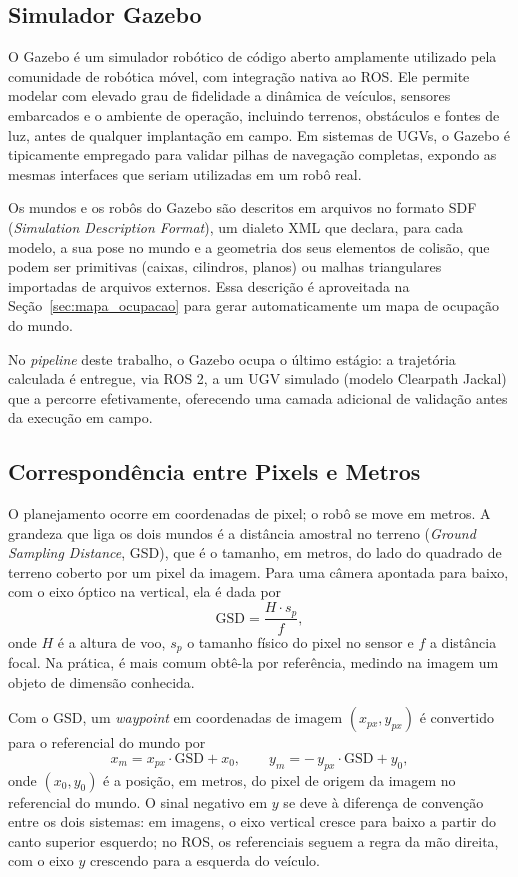 \documentclass[
    12pt,
    openright,
    oneside,
    a4paper,
    english,
    brazil
]{abntex2}
\begin{document}
\subsection{Simulador Gazebo}
\label{sec:gazebo}

O Gazebo \cite{koenig2004} é um simulador robótico de código aberto amplamente utilizado pela comunidade de robótica móvel, com integração nativa ao ROS. Ele permite modelar com elevado grau de fidelidade a dinâmica de veículos, sensores embarcados e o ambiente de operação, incluindo terrenos, obstáculos e fontes de luz, antes de qualquer implantação em campo. Em sistemas de UGVs, o Gazebo é tipicamente empregado para validar pilhas de navegação completas, expondo as mesmas interfaces que seriam utilizadas em um robô real.

Os mundos e os robôs do Gazebo são descritos em arquivos no formato SDF (\textit{Simulation Description Format}), um dialeto XML que declara, para cada modelo, a sua pose no mundo e a geometria dos seus elementos de colisão, que podem ser primitivas (caixas, cilindros, planos) ou malhas triangulares importadas de arquivos externos. Essa descrição é aproveitada na Seção~\ref{sec:mapa_ocupacao} para gerar automaticamente um mapa de ocupação do mundo.

No \textit{pipeline} deste trabalho, o Gazebo ocupa o último estágio: a trajetória calculada é entregue, via ROS 2, a um UGV simulado (modelo Clearpath Jackal) que a percorre efetivamente, oferecendo uma camada adicional de validação antes da execução em campo.

\subsection{Correspondência entre Pixels e Metros}
\label{sec:gsd}

O planejamento ocorre em coordenadas de pixel; o robô se move em metros. A grandeza que liga os dois mundos é a distância amostral no terreno (\emph{Ground Sampling Distance}, GSD), que é o tamanho, em metros, do lado do quadrado de terreno coberto por um pixel da imagem. Para uma câmera apontada para baixo, com o eixo óptico na vertical, ela é dada por
\[
\mathrm{GSD} = \frac{H \cdot s_p}{f},
\]
onde $H$ é a altura de voo, $s_p$ o tamanho físico do pixel no sensor e $f$ a distância focal. Na prática, é mais comum obtê-la por referência, medindo na imagem um objeto de dimensão conhecida.

Com o GSD, um \textit{waypoint} em coordenadas de imagem $(x_{px}, y_{px})$ é convertido para o referencial do mundo por
\[
x_m = x_{px} \cdot \mathrm{GSD} + x_0, \qquad
y_m = -\,y_{px} \cdot \mathrm{GSD} + y_0,
\]
onde $(x_0, y_0)$ é a posição, em metros, do pixel de origem da imagem no referencial do mundo. O sinal negativo em $y$ se deve à diferença de convenção entre os dois sistemas: em imagens, o eixo vertical cresce para baixo a partir do canto superior esquerdo; no ROS, os referenciais seguem a regra da mão direita, com o eixo $y$ crescendo para a esquerda do veículo.
\end{document}
